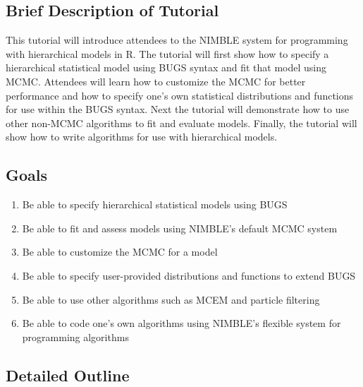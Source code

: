\documentclass[]{article}
\providecommand{\tightlist}{%
  \setlength{\itemsep}{0pt}\setlength{\parskip}{0pt}}
\begin{document}
\subsection{Brief Description of
Tutorial}\label{brief-description-of-tutorial}

This tutorial will introduce attendees to the NIMBLE system for programming with hierarchical models in R. The tutorial will first show how to specify a hierarchical statistical model using BUGS syntax and fit that model using MCMC. Attendees will learn how to customize the MCMC for better performance and how to specify one's own statistical distributions and functions for use within the BUGS syntax. Next the tutorial will demonstrate how to use other non-MCMC algorithms to fit and evaluate models. Finally, the tutorial will show how to write algorithms for use with hierarchical models. 

\subsection{Goals}\label{goals}

\begin{enumerate}
\def\labelenumi{\arabic{enumi}.}
\tightlist
\item
 Be able to specify hierarchical statistical models using BUGS
\item
 Be able to fit and assess models using NIMBLE's default MCMC system
\item
  Be able to customize the MCMC for a model
\item
  Be able to specify user-provided distributions and functions to extend BUGS
\item
Be able to use other algorithms such as MCEM and particle filtering
\item
Be able to code one's own algorithms using NIMBLE's flexible system for programming algorithms
\end{enumerate}

\subsection{Detailed Outline}\label{detailed-outline}
\end{document}
